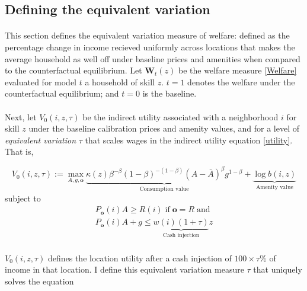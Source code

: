 \documentclass[12pt]{article}
\begin{document}
	\clearpage
	\subsection{Defining the equivalent variation}\label{Appendix:EquivalentVariation}
	
	\paragraph*{}
	
	This section defines the equivalent variation measure of welfare: defined as the percentage change in income recieved uniformly across locations that makes the average household as well off under baseline prices and amenities when compared to the counterfactual equilibrium. Let $\boldsymbol{W}_{t}(z)$ be the welfare measure \eqref{Welfare} evaluated for model $t$ a household of skill $z$. $t = 1$ denotes the welfare under the counterfactual equilibrium; and $t = 0$ is the baseline.
	
	\paragraph*{}
	Next, let $V_{0}(i, z, \tau)$ be the indirect utility associated with a neighborhood $i$ for skill $z$ under the baseline calibration prices and amenity values, and for a level of \textit{equivalent variation} $ \tau $ that scales wages in the indirect utility equation \eqref{utility}. That is, 
	
	\begin{equation}
		V_{0}(i, z, \tau) := \max_{A, g, \boldsymbol{o}} \underbrace{\kappa(z)\beta^{-\beta}(1-\beta)^{-(1-\beta)}(A - \bar{A})^{\beta}g^{1-\beta}}_{\text{Consumption value}} + \underbrace{\log b(i, z)}_{\text{Amenity value}}
	\end{equation} 
	subject to
	\begin{eqnarray*}
		P_{\boldsymbol{o}}(i)A \geq R(i) \; \text{if} \; \boldsymbol{o} = R \; 	\text{and} \\	
		P_{\boldsymbol{o}}(i)A + g \leq \underbrace{w(i)(1 + \tau)}_{\text{Cash injection}} z
	\end{eqnarray*}
	
	
	\paragraph*{}
	
	 $V_{0}(i, z, \tau)$ defines the location utility after a cash injection of $100 \times \tau \%$ of income in that location. I define this equivalent variation measure $\tau$ that uniquely solves the equation 
	
\end{document}
